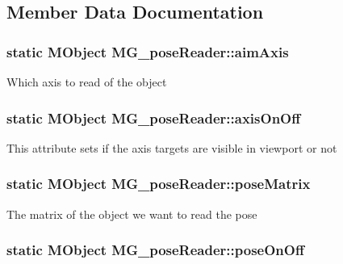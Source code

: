 \subsection{Member Data Documentation}
\hypertarget{class_m_g__pose_reader_ac0827c80b838e3536fea477045a4903d}{
\subsubsection[{aim\-Axis}]{\setlength{\rightskip}{0pt plus 5cm}static M\-Object M\-G\-\_\-pose\-Reader\-::aim\-Axis\hspace{0.3cm}{\ttfamily [static]}}}\label{class_m_g__pose_reader_ac0827c80b838e3536fea477045a4903d}
Which axis to read of the object \hypertarget{class_m_g__pose_reader_a87e5e32106ddc45fbd15390698f1cbef}{
\subsubsection[{axis\-On\-Off}]{\setlength{\rightskip}{0pt plus 5cm}static M\-Object M\-G\-\_\-pose\-Reader\-::axis\-On\-Off\hspace{0.3cm}{\ttfamily [static]}}}\label{class_m_g__pose_reader_a87e5e32106ddc45fbd15390698f1cbef}
This attribute sets if the axis targets are visible in viewport or not \hypertarget{class_m_g__pose_reader_a37357d03b4a67aecbe5b3a7e3779cac7}{
\subsubsection[{pose\-Matrix}]{\setlength{\rightskip}{0pt plus 5cm}static M\-Object M\-G\-\_\-pose\-Reader\-::pose\-Matrix\hspace{0.3cm}{\ttfamily [static]}}}\label{class_m_g__pose_reader_a37357d03b4a67aecbe5b3a7e3779cac7}
The matrix of the object we want to read the pose \hypertarget{class_m_g__pose_reader_a94faeca46f1634cb4634df288acad4f2}{
\subsubsection[{pose\-On\-Off}]{\setlength{\rightskip}{0pt plus 5cm}static M\-Object M\-G\-\_\-pose\-Reader\-::pose\-On\-Off\hspace{0.3cm}{\ttfamily [static]}}}\label{class_m_g__pose_reader_a94faeca46f1634cb4634df288acad4f2}
